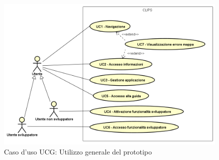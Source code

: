 \documentclass[../AnalisiDeiRequisiti.tex]{subfiles}
\begin{document}
        \begin{figure}[!h]
            \centering
            \includegraphics[scale=0.95, width=\textwidth]{img/UCG.png}
            \caption{Caso d'uso UCG: Utilizzo generale del prototipo}\label{fig:UCG} 
        \end{figure}
\end{document}
